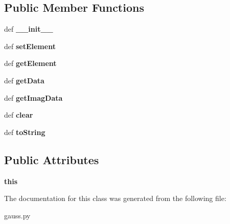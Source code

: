 \subsection*{Public Member Functions}
\begin{DoxyCompactItemize}
\item 
\hypertarget{classgauss_1_1_g_e_matrix_a5d7dc25117bbf354953343a7d20ef7b8}{def {\bfseries \-\_\-\-\_\-init\-\_\-\-\_\-}}\label{classgauss_1_1_g_e_matrix_a5d7dc25117bbf354953343a7d20ef7b8}

\item 
\hypertarget{classgauss_1_1_g_e_matrix_a3f05711d1279249a48c41fc9a280f570}{def {\bfseries set\-Element}}\label{classgauss_1_1_g_e_matrix_a3f05711d1279249a48c41fc9a280f570}

\item 
\hypertarget{classgauss_1_1_g_e_matrix_a0ad68ffd6935cfdd308ee9786acc521f}{def {\bfseries get\-Element}}\label{classgauss_1_1_g_e_matrix_a0ad68ffd6935cfdd308ee9786acc521f}

\item 
\hypertarget{classgauss_1_1_g_e_matrix_ade683b71065ae9f6dbcfe8a4756a643c}{def {\bfseries get\-Data}}\label{classgauss_1_1_g_e_matrix_ade683b71065ae9f6dbcfe8a4756a643c}

\item 
\hypertarget{classgauss_1_1_g_e_matrix_a7460ad3cc429cc6a94f6c2958920b738}{def {\bfseries get\-Imag\-Data}}\label{classgauss_1_1_g_e_matrix_a7460ad3cc429cc6a94f6c2958920b738}

\item 
\hypertarget{classgauss_1_1_g_e_matrix_ad35deaa988f79e710f8319fbe16fc374}{def {\bfseries clear}}\label{classgauss_1_1_g_e_matrix_ad35deaa988f79e710f8319fbe16fc374}

\item 
\hypertarget{classgauss_1_1_g_e_matrix_a8a37819ceb793e08caaa1a16184d797c}{def {\bfseries to\-String}}\label{classgauss_1_1_g_e_matrix_a8a37819ceb793e08caaa1a16184d797c}

\end{DoxyCompactItemize}
\subsection*{Public Attributes}
\begin{DoxyCompactItemize}
\item 
\hypertarget{classgauss_1_1_g_e_matrix_a0899868aa51479ad6854f2f5b4263968}{{\bfseries this}}\label{classgauss_1_1_g_e_matrix_a0899868aa51479ad6854f2f5b4263968}

\end{DoxyCompactItemize}


The documentation for this class was generated from the following file\-:\begin{DoxyCompactItemize}
\item 
gauss.\-py\end{DoxyCompactItemize}
